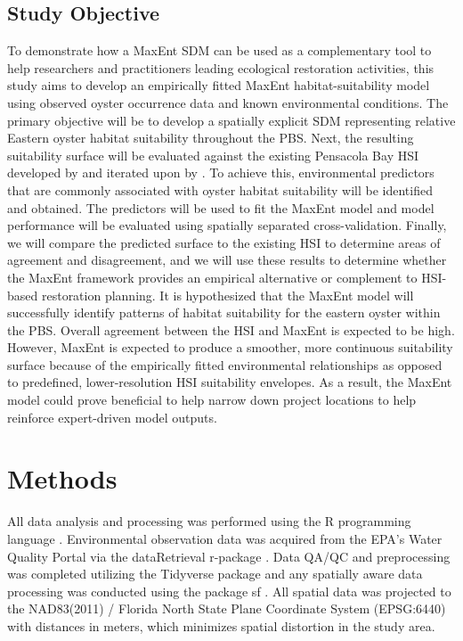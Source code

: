 \documentclass[
  review]{elsarticle}
\begin{document}
\subsection{Study Objective}\label{study-objective}

To demonstrate how a MaxEnt SDM can be used as a complementary tool to
help researchers and practitioners leading ecological restoration
activities, this study aims to develop an empirically fitted MaxEnt
habitat-suitability model using observed oyster occurrence data and
known environmental conditions. The primary objective will be to develop
a spatially explicit SDM representing relative Eastern oyster habitat
suitability throughout the PBS. Next, the resulting suitability surface
will be evaluated against the existing Pensacola Bay HSI developed by
\citet{Geselbracht2024} and iterated upon by
\citet{PPBEP_OysterRestoration}. To achieve this, environmental
predictors that are commonly associated with oyster habitat suitability
will be identified and obtained. The predictors will be used to fit the
MaxEnt model and model performance will be evaluated using spatially
separated cross-validation. Finally, we will compare the predicted
surface to the existing HSI to determine areas of agreement and
disagreement, and we will use these results to determine whether the
MaxEnt framework provides an empirical alternative or complement to
HSI-based restoration planning. It is hypothesized that the MaxEnt model
will successfully identify patterns of habitat suitability for the
eastern oyster within the PBS. Overall agreement between the HSI and
MaxEnt is expected to be high. However, MaxEnt is expected to produce a
smoother, more continuous suitability surface because of the empirically
fitted environmental relationships as opposed to predefined,
lower-resolution HSI suitability envelopes. As a result, the MaxEnt
model could prove beneficial to help narrow down project locations to
help reinforce expert-driven model outputs.

\section{Methods}\label{methods}

All data analysis and processing was performed using the R programming
language \citep{r}. Environmental observation data was acquired from the
EPA's Water Quality Portal via the dataRetrieval r-package
\citep{wqp_2026, dataRetrieval2026}. Data QA/QC and preprocessing was
completed utilizing the Tidyverse package and any spatially aware data
processing was conducted using the package sf \citep{tidyverse, sf}. All
spatial data was projected to the NAD83(2011) / Florida North State
Plane Coordinate System (EPSG:6440) with distances in meters, which
minimizes spatial distortion in the study area.
\end{document}
